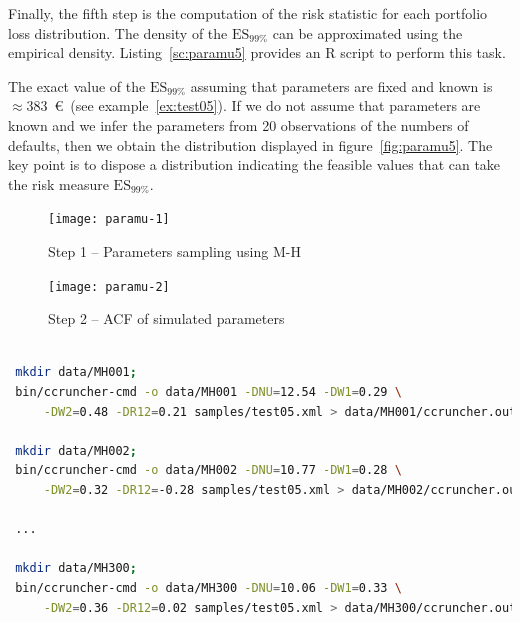 \documentclass[11pt,fleqn]{book} %
\begin{document}
\begin{example}
	Finally, the fifth step is the computation of the risk statistic
	for each portfolio loss distribution. The density of the $\text{ES}_{99\%}$ 
	can be approximated using the empirical density. Listing~\ref{sc:paramu5}
	provides an R script to perform this task. 

	The exact value of the $\text{ES}_{99\%}$ assuming that parameters are 
	fixed and known is $\approx 383$\ \euro\ (see example~\ref{ex:test05}). 
	If we do not assume that parameters are known and we infer the parameters 
	from 20 observations of the numbers of defaults, then we obtain the 
	distribution displayed in figure~\ref{fig:paramu5}. 
	The key point is to dispose a distribution indicating the 
	feasible values that can take the risk measure $\text{ES}_{99\%}$.
\end{example}

\begin{figure}[!ht]
	\centering
	\texttt{[image: paramu-1]}
	\caption{Step 1 -- Parameters sampling using M-H}
	\label{fig:paramu1}
\end{figure}

\begin{figure}[ht]
	\centering
	\texttt{[image: paramu-2]}
	\caption{Step 2 -- ACF of simulated parameters}
	\label{fig:paramu2}
\end{figure}

\begin{lstlisting}[language=bash, label={sc:paramu4}, caption={Execution of multiple CCrunchers (bash script)}]
 
 mkdir data/MH001;
 bin/ccruncher-cmd -o data/MH001 -DNU=12.54 -DW1=0.29 \
     -DW2=0.48 -DR12=0.21 samples/test05.xml > data/MH001/ccruncher.out; 
 
 mkdir data/MH002; 
 bin/ccruncher-cmd -o data/MH002 -DNU=10.77 -DW1=0.28 \
     -DW2=0.32 -DR12=-0.28 samples/test05.xml > data/MH002/ccruncher.out;

 ...

 mkdir data/MH300; 
 bin/ccruncher-cmd -o data/MH300 -DNU=10.06 -DW1=0.33 \
     -DW2=0.36 -DR12=0.02 samples/test05.xml > data/MH300/ccruncher.out; 
 
\end{lstlisting}
\end{document}
